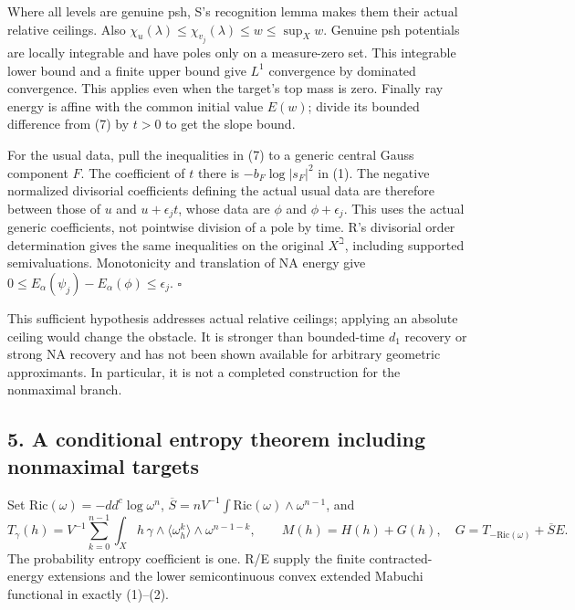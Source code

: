 \documentclass[
  11pt,
]{article}
\begin{document}
Where all levels are genuine psh, S's recognition lemma makes them their
actual relative ceilings. Also
\(\chi_u(\lambda)\le\chi_{v_j}(\lambda)\le w\le\sup_X w\). Genuine psh
potentials are locally integrable and have poles only on a measure-zero
set. This integrable lower bound and a finite upper bound give \(L^1\)
convergence by dominated convergence. This applies even when the
target's top mass is zero. Finally ray energy is affine with the common
initial value \(E(w)\); divide its bounded difference from (7) by
\(t>0\) to get the slope bound.

For the usual data, pull the inequalities in (7) to a generic central
Gauss component \(F\). The coefficient of \(t\) there is
\(-b_F\log|s_F|^2\) in (1). The negative normalized divisorial
coefficients defining the actual usual data are therefore between those
of \(u\) and \(u+\epsilon_jt\), whose data are \(\phi\) and
\(\phi+\epsilon_j\). This uses the actual generic coefficients, not
pointwise division of a pole by time. R's divisorial order determination
gives the same inequalities on the original \(X^\beth\), including
supported semivaluations. Monotonicity and translation of NA energy give
\(0\le E_\alpha(\psi_j)-E_\alpha(\phi)\le\epsilon_j\). \(\square\)

This sufficient hypothesis addresses actual relative ceilings; applying
an absolute ceiling would change the obstacle. It is stronger than
bounded-time \(d_1\) recovery or strong NA recovery and has not been
shown available for arbitrary geometric approximants. In particular, it
is not a completed construction for the nonmaximal branch.

\subsection{5. A conditional entropy theorem including nonmaximal
targets}\label{a-conditional-entropy-theorem-including-nonmaximal-targets}

Set \(\mathrm{Ric}(\omega)=-dd^c\log\omega^n\),
\(\overline S=nV^{-1}\int\mathrm{Ric}(\omega)\wedge\omega^{n-1}\), and
\[
T_\gamma(h)=V^{-1}\sum_{k=0}^{n-1}\int_Xh\,\gamma\wedge
 \langle\omega_h^k\rangle\wedge\omega^{n-1-k},\qquad
M(h)=H(h)+G(h),\quad G=T_{-\mathrm{Ric}(\omega)}+\overline S E.
                                                               \tag{9}
\] The probability entropy coefficient is one. R/E supply the finite
contracted-energy extensions and the lower semicontinuous convex
extended Mabuchi functional in exactly (1)--(2).
\end{document}
